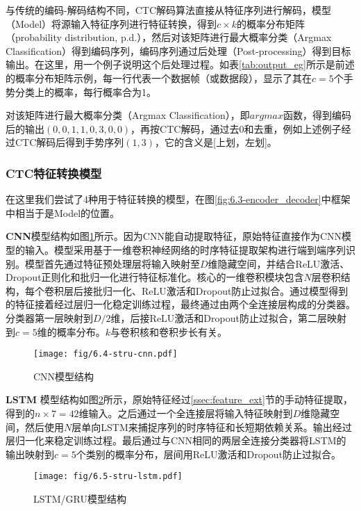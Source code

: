 与传统的编码-解码结构不同，CTC解码算法直接从特征序列进行解码，模型（Model）将源输入特征序列进行特征转换，得到$c\times k$的概率分布矩阵（probability distribution, p.d.），然后对该矩阵进行最大概率分类（Argmax Classification）得到编码序列，编码序列通过后处理（Post-processing）得到目标输出。在这里，用一个例子说明这个后处理过程。如表\ref{tab:output_eg}所示是前述的概率分布矩阵示例，每一行代表一个数据帧（或数据段），显示了其在$c=5$个手势分类上的概率，每行概率合为1。





对该矩阵进行最大概率分类（Argmax Classification），即$argmax$函数，得到编码后的输出$(0, 0, 1, 1, 0, 3, 0, 0)$，再按CTC解码\cites{graves2006connectionist}，通过去0和去重，例如上述例子经过CTC解码后得到手势序列$(1, 3)$，它的含义是[上划，左划]。

\subsubsection{CTC特征转换模型}\label{sssec:ctc_model}

在这里我们尝试了4种用于特征转换的模型，在图\ref{fig:6.3-encoder_decoder}中框架中相当于是Model的位置。

\textbf{CNN}\hspace{5pt}模型结构如图\ref{fig:6.3-stru-cnn}所示。因为CNN能自动提取特征，原始特征直接作为CNN模型的输入。模型采用基于一维卷积神经网络的时序特征提取架构进行端到端序列识别。模型首先通过特征预处理层将输入映射至$D$维隐藏空间，并结合ReLU激活、Dropout正则化和批归一化进行特征标准化。核心的一维卷积模块包含$N$层卷积结构，每个卷积层后接批归一化、ReLU激活和Dropout防止过拟合。通过模型得到的特征接着经过层归一化稳定训练过程，最终通过由两个全连接层构成的分类器。分类器第一层映射到$D/2$维，后接ReLU激活和Dropout防止过拟合，第二层映射到$c=5$维的概率分布。$k$与卷积核和卷积步长有关。

\begin{figure}
    \centering
    \texttt{[image: fig/6.4-stru-cnn.pdf]}
    \caption{CNN模型结构}
    \label{fig:6.3-stru-cnn}
\end{figure}

\textbf{LSTM}\hspace{5pt} 模型结构如图\ref{fig:6.5-stru-lstm}所示，原始特征经过\ref{ssec:feature_ext}节的手动特征提取，得到的$n\times 7=42$维输入。之后通过一个全连接层将输入特征映射到$D$维隐藏空间，然后使用$N$层单向LSTM来捕捉序列的时序特征和长短期依赖关系。输出经过层归一化来稳定训练过程。最后通过与CNN相同的两层全连接分类器将LSTM的输出映射到$c=5$个类别的概率分布，层间用ReLU激活和Dropout防止过拟合。
\begin{figure}
    \centering
    \texttt{[image: fig/6.5-stru-lstm.pdf]}
    \caption{LSTM/GRU模型结构}
    \label{fig:6.5-stru-lstm}
\end{figure}

